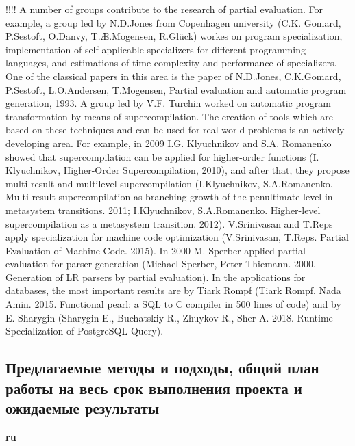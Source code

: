 \documentclass[12pt]{article}  %
\theoremstyle{remark}
\begin{document}
!!!! A number of groups contribute to the research of partial evaluation. For example, a group led by N.D.Jones from Copenhagen university (C.K. Gomard, P.Sestoft, O.Danvy, T.Æ.Mogensen, R.Glück) workes on program specialization, implementation of self-applicable specializers for different programming languages, and estimations of time complexity and performance of specializers. One of the classical papers in this area is the paper of N.D.Jones, C.K.Gomard, P.Sestoft, L.O.Andersen, T.Mogensen, Partial evaluation and automatic program generation, 1993. A group led by V.F. Turchin worked on automatic program transformation by means of supercompilation. The creation of tools which are based on these techniques and can be used for real-world problems is an actively developing area. For example, in 2009 I.G. Klyuchnikov and S.A. Romanenko showed that supercompilation can be applied for higher-order functions (I. Klyuchnikov, Higher-Order Supercompilation, 2010), and after that, they propose multi-result and multilevel supercompilation (I.Klyuchnikov, S.A.Romanenko. Multi-result supercompilation as branching growth of the penultimate level in metasystem transitions. 2011; I.Klyuchnikov, S.A.Romanenko. Higher-level supercompilation as a metasystem transition. 2012). V.Srinivasan and T.Reps apply specialization for machine code optimization (V.Srinivasan, T.Reps. Partial Evaluation of Machine Code. 2015). In 2000 M. Sperber applied partial evaluation for parser generation (Michael Sperber, Peter Thiemann. 2000. Generation of LR parsers by partial evaluation). In the applications for databases, the most important results are by Tiark Rompf (Tiark Rompf, Nada Amin. 2015. Functional pearl: a SQL to C compiler in 500 lines of code) and by E. Sharygin (Sharygin E., Buchatskiy R., Zhuykov R., Sher A. 2018. Runtime Specialization of PostgreSQL Query).


\subsection{Предлагаемые методы и подходы, общий план работы на весь срок выполнения проекта и ожидаемые результаты }

\textbf{ru}\\
\end{document}
